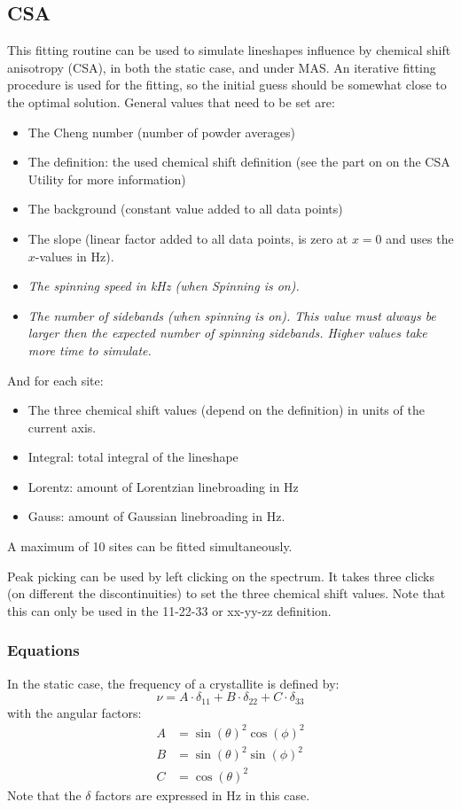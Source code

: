 \documentclass[11pt,a4paper]{article}
\begin{document}
\subsection{CSA}
This fitting routine can be used to simulate lineshapes influence by chemical shift anisotropy (CSA), in both
the static case, and under MAS. An iterative fitting procedure is used for the fitting, so the initial guess
should be somewhat close to the optimal solution. General values that need to be set are:
\begin{itemize}
\item The Cheng number (number of powder averages)
\item The definition: the used chemical shift definition (see the part on on the CSA Utility for more information)
\item The background (constant value added to all data points)
\item The slope (linear factor added to all data points, is zero at $x=0$ and uses the $x$-values in Hz).
\item \textit{The spinning speed in kHz (when Spinning is on).}
\item \textit{The number of sidebands (when spinning is on). This value must always be larger then the
  expected number of spinning sidebands. Higher values take more time to simulate.}
\end{itemize}
And for each site:
\begin{itemize}
\item The three chemical shift values (depend on the definition) in units of the current axis.
\item Integral: total integral of the lineshape
\item Lorentz: amount of Lorentzian linebroading in Hz
\item Gauss: amount of Gaussian linebroading in Hz.
\end{itemize}
A maximum of 10 sites can be fitted simultaneously.

Peak picking can be used by left clicking on the spectrum. It takes three clicks (on different the
discontinuities) to set the three chemical shift values. Note that this can only be used in the 11-22-33 or
xx-yy-zz definition.


\subsubsection*{Equations}
In the static case, the frequency of a crystallite is defined by:
\begin{equation}
  \nu = A \cdot \delta_{11} + B \cdot \delta_{22} + C \cdot \delta_{33}
\end{equation}
with the angular factors:
\begin{align}
  A &= \sin(\theta)^2 \cos(\phi)^2 \\
  B &= \sin(\theta)^2 \sin(\phi)^2 \\
  C &= \cos(\theta)^2
\end{align}
Note that the $\delta$ factors are expressed in Hz in this case.
\end{document}
